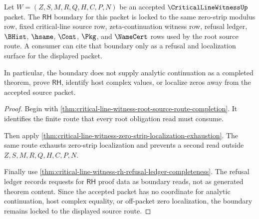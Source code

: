 \begin{theorem}
\label{thm:critical-line-witness-rh-boundary-source-lock}
Let $W=(Z,S,M,R,Q,H,C,P,N)$ be an accepted $\CriticalLineWitnessUp$ packet. The $\mathsf{RH}$ boundary for this packet is locked to the same zero-strip modulus row, fixed critical-line source row, zeta-continuation witness row, refusal ledger, $\BHist$, $\hsame$, $\Cont$, $\Pkg$, and $\NameCert$ rows used by the root source route. A consumer can cite that boundary only as a refusal and localization surface for the displayed packet.

In particular, the boundary does not supply analytic continuation as a completed theorem, prove $\mathsf{RH}$, identify host complex values, or localize zeros away from the accepted source packet.
\end{theorem}
\begin{proof}
Begin with \autoref{thm:critical-line-witness-root-source-route-completion}. It identifies the finite route that every root obligation read must consume.

Then apply \autoref{thm:critical-line-witness-zero-strip-localization-exhaustion}. The same route exhausts zero-strip localization and prevents a second read outside $Z,S,M,R,Q,H,C,P,N$.

Finally use \autoref{thm:critical-line-witness-rh-refusal-ledger-completeness}. The refusal ledger records requests for $\mathsf{RH}$ proof data as boundary reads, not as generated theorem content. Since the accepted packet has no coordinate for analytic continuation, host complex equality, or off-packet zero localization, the boundary remains locked to the displayed source route.
\end{proof}
